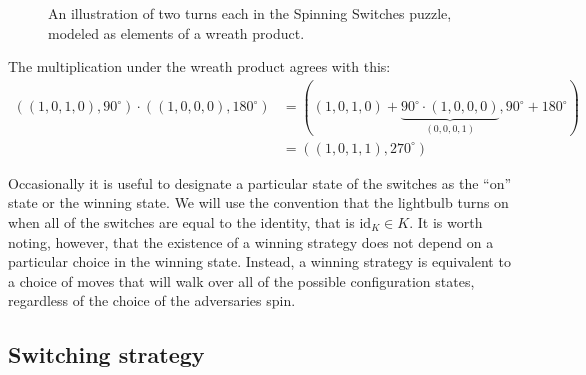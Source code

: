\begin{example}
\begin{figure}
    \caption[A wreath product interpretation of a spinning switches puzzle.]{
      An illustration of two turns each in the Spinning Switches puzzle,
      modeled as elements of a wreath product.
    }
    \label{fig:WreathProduct}
  \end{figure}

  The multiplication under the wreath product agrees with this: \begin{align*}
    ((1,0,1,0), 90^\circ) \cdot ((1,0,0,0), 180^\circ)
    &= ((1,0,1,0) + \underbrace{90^\circ \cdot (1,0,0,0)}_{(0,0,0,1)}, 90^\circ + 180^\circ) \\
    &= ((1,0,1,1), 270^\circ)
  \end{align*}
\end{example}

Occasionally it is useful to designate a particular state of the switches as the
``on'' state or the winning state. We will use the convention that the lightbulb
turns on when all of the switches are equal to the identity, that is
$\mathrm{id}_K \in K$.
It is worth noting, however, that the existence of a winning strategy does not
depend on a particular choice in the winning state.
Instead, a winning strategy is equivalent to a choice of moves that will walk
over all of the possible configuration states, regardless of the choice of the
adversaries spin.

\subsection{Switching strategy}

